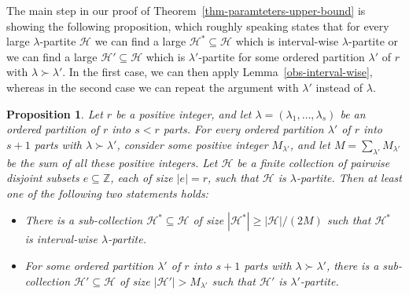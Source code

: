 \documentclass[11pt]{article}
\newtheorem{proposition}[theorem]{Proposition}
\theoremstyle{definition}
\numberwithin{equation}{section}
\numberwithin{figure}{section}
\newcommand{\su}{\subseteq}
\newcommand{\Z}{\mathbb{Z}}
\newcommand{\HH}{\mathcal{H}}
\begin{document}
The main step in our proof of Theorem~\ref{thm-paramteters-upper-bound} is showing the following proposition, which roughly speaking states that for every large $\lambda$-partite $\HH$ we can find a large $\HH^*\su \HH$ which is interval-wise $\lambda$-partite or we can find a large $\HH'\su \HH$ which is $\lambda'$-partite for some ordered partition $\lambda'$ of $r$ with $\lambda\succ \lambda'$. In the first case, we can then apply Lemma~\ref{obs-interval-wise}, whereas in the second case we can repeat the argument with $\lambda'$ instead of $\lambda$.

\begin{proposition}\label{prop-two-options}
Let $r$ be a positive integer, and let $\lambda=(\lambda_1,\dots,\lambda_s)$ be an ordered partition of $r$ into $s<r$ parts. For every ordered partition $\lambda'$ of $r$ into $s+1$ parts with $\lambda\succ\lambda'$, consider some positive integer $M_{\lambda'}$, and let $M=\sum_{\lambda'} M_{\lambda'}$ be the sum of all these positive integers. Let $\HH$ be a finite collection of pairwise disjoint subsets $e\su \Z$, each of size $|e|=r$, such that $\HH$ is $\lambda$-partite. Then at least one of the following two statements holds:
\begin{itemize}
    \item[(a)] There is a sub-collection $\HH^*\su \HH$ of size $|\HH^*|\ge |\HH|/(2M)$ such that $\HH^*$ is interval-wise $\lambda$-partite.
    \item[(b)] For some ordered partition $\lambda'$ of $r$ into $s+1$ parts with $\lambda\succ\lambda'$, there is a sub-collection $\HH'\su \HH$ of size $|\HH'|>M_{\lambda'}$ such that $\HH'$ is $\lambda'$-partite.
\end{itemize}
\end{proposition}
\end{document}
